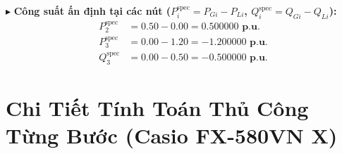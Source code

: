 \documentclass[12pt,a4paper,oneside]{report}
\begin{document}
\begin{table}[H]
\centering
\caption{Thông số nút của hệ thống điện truyền tải mẫu 3 nút chuẩn.}
\label{tab:3bus_nodal_data}
\end{table}

\begin{table}[H]
\centering
\caption{Thông số nhánh đường dây hình $\pi$ tương đương ($S_{\text{base}} = 100.0\text{ MVA}$).}
\label{tab:3bus_branch_data}
\end{table}

\noindent $\blacktriangleright$ \textbf{Công suất ấn định tại các nút ($P_i^{\text{spec}} = P_{Gi} - P_{Li}$, $Q_i^{\text{spec}} = Q_{Gi} - Q_{Li}$):}
\begin{align}
P_2^{\text{spec}} &= 0.50 - 0.00 = \mathbf{0.500000\text{ p.u.}} \\
P_3^{\text{spec}} &= 0.00 - 1.20 = \mathbf{-1.200000\text{ p.u.}} \\
Q_3^{\text{spec}} &= 0.00 - 0.50 = \mathbf{-0.500000\text{ p.u.}}
\end{align}

\section{Chi Tiết Tính Toán Thủ Công Từng Bước (Casio FX-580VN X)}
\end{document}

